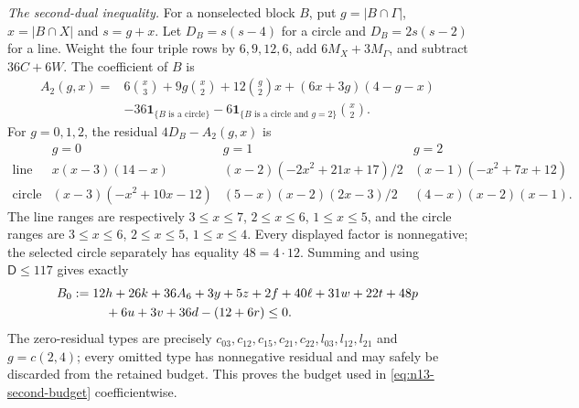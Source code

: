 \smallskip
\noindent\emph{The second-dual inequality.}
For a nonselected block $B$, put $g=|B\cap\Gamma|$, $x=|B\cap X|$ and
$s=g+x$.  Let $D_B=s(s-4)$ for a circle and $D_B=2s(s-2)$ for a line.
Weight the four triple rows by $6,9,12,6$, add $6M_X+3M_\Gamma$, and
subtract $36C+6W$.  The coefficient of $B$ is
\begin{align*}
 A_2(g,x)={}&6\binom x3+9g\binom x2+12\binom g2x
 +(6x+3g)(4-g-x)\\
 &-36\mathbf1_{\{B\text{ is a circle}\}}
 -6\mathbf1_{\{B\text{ is a circle and }g=2\}}\binom x2.
\end{align*}
For $g=0,1,2$, the residual $4D_B-A_2(g,x)$ is
\[
\begin{array}{c|ccc}
&g=0&g=1&g=2\\ \hline
\text{line}&
x(x-3)(14-x)&
(x-2)(-2x^2+21x+17)/2&
(x-1)(-x^2+7x+12)\\
\text{circle}&
(x-3)(-x^2+10x-12)&
(5-x)(x-2)(2x-3)/2&
(4-x)(x-2)(x-1).
\end{array}
\]
The line ranges are respectively $3\leq x\leq7$, $2\leq x\leq6$,
$1\leq x\leq5$, and the circle ranges are $3\leq x\leq6$,
$2\leq x\leq5$, $1\leq x\leq4$.  Every displayed factor is nonnegative;
the selected circle separately has equality $48=4\cdot12$.  Summing and
using $\mathsf D\leq117$ gives exactly
\begin{align}
 B_0:={}&12h+26k+36A_6+3y+5z+2f+40\ell+31w+22t+48p\notag\\
        &\quad+6u+3v+36d-(12+6r)\leq0.             \label{eq:n13-B0}
\end{align}
The zero-residual types are precisely
$c_{03},c_{12},c_{15},c_{21},c_{22},l_{03},l_{12},l_{21}$ and
$g=c(2,4)$; every omitted type has nonnegative residual and may safely be
discarded from the retained budget.
This proves the budget used in \eqref{eq:n13-second-budget}
coefficientwise.

